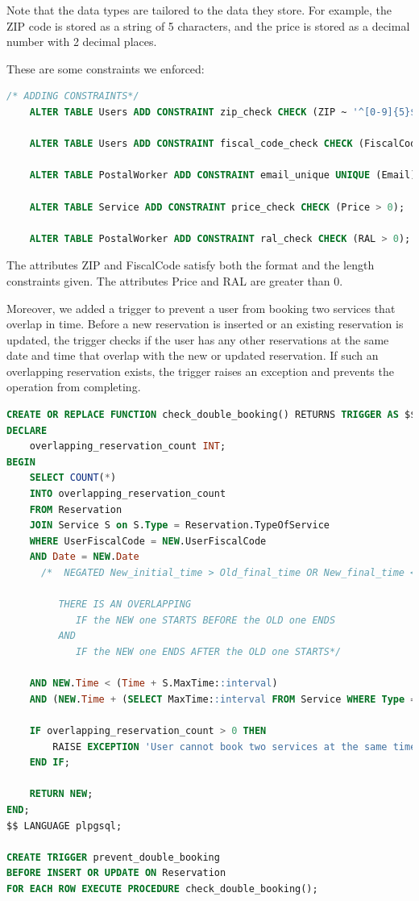 \documentclass{article}
\begin{document}
Note that the data types are tailored to the data they store. For example, the ZIP code is stored as a string of 5 characters, and the price is stored as a decimal number with 2 decimal places.

These are some constraints we enforced:
\begin{lstlisting}[language=SQL]
    /* ADDING CONSTRAINTS*/
    ALTER TABLE Users ADD CONSTRAINT zip_check CHECK (ZIP ~ '^[0-9]{5}$');
    
    ALTER TABLE Users ADD CONSTRAINT fiscal_code_check CHECK (FiscalCode ~ '^[A-Z]{6}[0-9]{2}[A-Z][0-9]{2}[A-Z][0-9]{3}[A-Z]$');
    
    ALTER TABLE PostalWorker ADD CONSTRAINT email_unique UNIQUE (Email);
    
    ALTER TABLE Service ADD CONSTRAINT price_check CHECK (Price > 0);
    
    ALTER TABLE PostalWorker ADD CONSTRAINT ral_check CHECK (RAL > 0);
\end{lstlisting}

The attributes ZIP and FiscalCode satisfy both the format and the length constraints given. The attributes Price and RAL are greater than 0.

Moreover, we added a trigger to prevent a user from booking two services that overlap in time. Before a new reservation is inserted or an existing reservation is updated, the trigger checks if the user has any other reservations at the same date and time that overlap with the new or updated reservation. If such an overlapping reservation exists, the trigger raises an exception and prevents the operation from completing.
\begin{lstlisting}[language=SQL]
CREATE OR REPLACE FUNCTION check_double_booking() RETURNS TRIGGER AS $$
DECLARE
    overlapping_reservation_count INT;
BEGIN
    SELECT COUNT(*)
    INTO overlapping_reservation_count
    FROM Reservation
    JOIN Service S on S.Type = Reservation.TypeOfService
    WHERE UserFiscalCode = NEW.UserFiscalCode
    AND Date = NEW.Date
      /*  NEGATED New_initial_time > Old_final_time OR New_final_time < old_initial_time

         THERE IS AN OVERLAPPING
            IF the NEW one STARTS BEFORE the OLD one ENDS
         AND
            IF the NEW one ENDS AFTER the OLD one STARTS*/

    AND NEW.Time < (Time + S.MaxTime::interval)
    AND (NEW.Time + (SELECT MaxTime::interval FROM Service WHERE Type = NEW.TypeOfService)) > Time;

    IF overlapping_reservation_count > 0 THEN
        RAISE EXCEPTION 'User cannot book two services at the same time';
    END IF;

    RETURN NEW;
END;
$$ LANGUAGE plpgsql;

CREATE TRIGGER prevent_double_booking
BEFORE INSERT OR UPDATE ON Reservation
FOR EACH ROW EXECUTE PROCEDURE check_double_booking();

\end{lstlisting}
\end{document}
